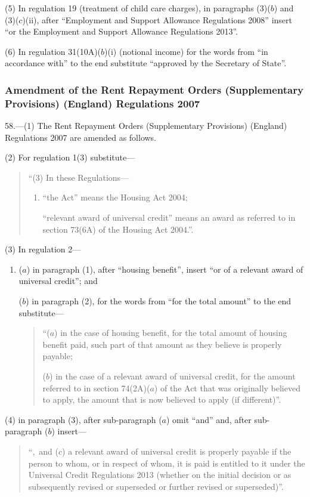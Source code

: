 \documentclass[12pt,a4paper]{article}
\begin{document}
(5) In regulation 19 (treatment of child care charges), in paragraphs (3)($b$)  and (3)($c$)(ii), after “Employment and Support Allowance Regulations 2008” insert “or the Employment and Support Allowance Regulations 2013”.

(6) In regulation 31(10A)($b$)(i)  (notional income) for the words from “in accordance with” to the end substitute “approved by the Secretary of State”.

\subsubsection[58. Amendment of the Rent Repayment Orders (Supplementary Provisions) (England) Regulations 2007]{Amendment of the Rent Repayment Orders (Supplementary Provisions) (England) Regulations 2007}

58.—(1) The Rent Repayment Orders (Supplementary Provisions) (England) Regulations 2007 are amended as follows.

(2) For regulation 1(3) substitute—
\begin{quotation}
“(3) In these Regulations—
\begin{enumerate}\item[]
“the Act” means the Housing Act 2004;

“relevant award of universal credit” means an award as referred to in section 73(6A) of the Housing Act 2004.”.
\end{enumerate}
\end{quotation}

(3) In regulation 2—
\begin{enumerate}\item[]
($a$) in paragraph (1), after “housing benefit”, insert “or of a relevant award of universal credit”; and

($b$) in paragraph (2), for the words from “for the total amount” to the end substitute—
\begin{quotation}
“($a$) in the case of housing benefit, for the total amount of housing benefit paid, such part of that amount as they believe is properly payable;

($b$) in the case of a relevant award of universal credit, for the amount referred to in section 74(2A)($a$)  of the Act that was originally believed to apply, the amount that is now believed to apply (if different)”.
\end{quotation}
\end{enumerate}

(4) in paragraph (3), after sub-paragraph ($a$)  omit “and” and, after sub-paragraph ($b$)  insert—
\begin{quotation}
“,~and ($c$)  a relevant award of universal credit is properly payable if the person to whom, or in respect of whom, it is paid is entitled to it under the Universal Credit Regulations 2013 (whether on the initial decision or as subsequently revised or superseded or further revised or superseded)”.
\end{quotation}
\end{document}
